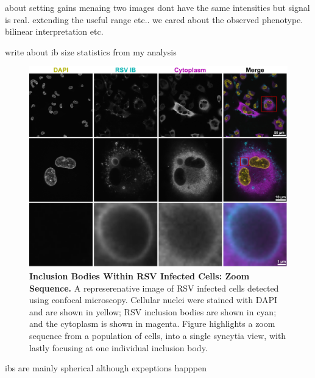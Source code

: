 about setting gains menaing two images dont have the same intensities but signal is real. extending the useful range etc..  we cared about the observed phenotype. bilinear interpretation etc.

write about ib size statistics from my analysis

\begin{figure}
    \centering
    \includegraphics[width=1\linewidth]{08. Chapter 3/Figs/01. Localisation introduction/01. IB-zooms.pdf}
    \caption[Inclusion Bodies Within RSV Infected Cells: Zoom Sequence.]{\textbf{Inclusion Bodies Within RSV Infected Cells: Zoom Sequence.} A represerenative image of RSV infected cells detected using confocal microscopy. Cellular nuclei were stained with DAPI and are shown in yellow; RSV inclusion bodies are shown in cyan; and the cytoplasm is shown in magenta. Figure highlights a zoom sequence from a population of cells, into a single syncytia view, with lastly focusing at one individual inclusion body.}
    \label{fig:Inclusion Bodies Within RSV Infected Cells: Zoom Sequence}
\end{figure}

ibs are mainly spherical although expeptions happpen

